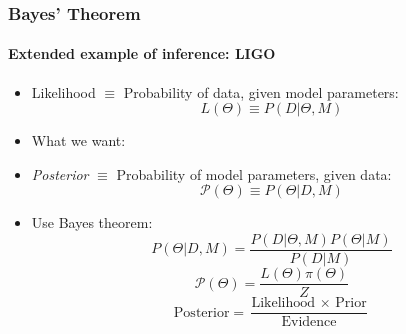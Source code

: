 \documentclass[%
]{beamer}
\begin{document}
\begin{frame}
\end{frame}

\begin{frame}
    \frametitle{Bayes' Theorem}
    \framesubtitle{Extended example of inference: LIGO}
    \begin{itemize}
        \item Likelihood \pause$\equiv$ Probability of data, given model parameters: 
            \pause\[L(\Theta) \equiv P(D|\Theta,M)\] 
        \pause \item What we want: 
        \item {\em Posterior} \pause$\equiv$ Probability of model parameters, given data:
            \pause\[\mathcal{P}(\Theta) \equiv P(\Theta|D,M)\] 
            \pause \item Use Bayes theorem:
            \pause \[ P(\Theta|D,M) = \frac{P(D|\Theta, M) P(\Theta|M)}{P(D|M)}\]
            \pause \[ \mathcal{P}(\Theta) = \frac{L(\Theta) \pi(\Theta)}{Z}\]
            \pause \[ \text{Posterior} = \frac{\text{Likelihood $\times$ Prior}}{\text{Evidence}}\]
    \end{itemize}
\end{frame}
\end{document}
